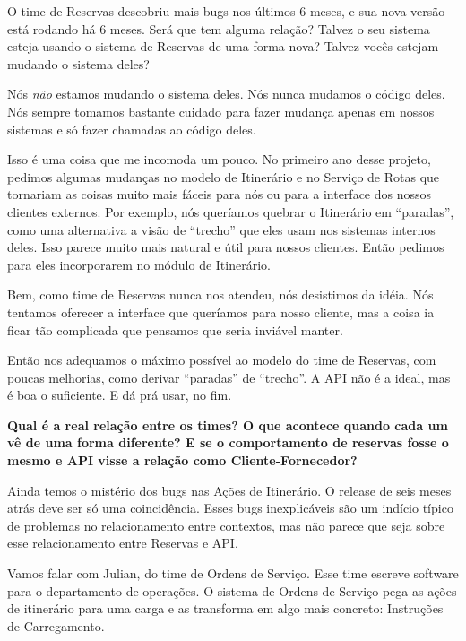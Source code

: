 \documentclass[12pt,play]{article}
\begin{document}
\narr {}
\scene
\dani O time de Reservas descobriu mais bugs nos últimos 6 meses, e sua nova versão está rodando há 6 meses. Será que tem alguma relação? Talvez o seu sistema esteja usando o sistema de Reservas de uma forma nova? Talvez vocês estejam mudando o sistema deles?

\joao {} Nós \emph{não} estamos mudando o sistema deles. Nós nunca mudamos o código deles. Nós sempre tomamos bastante cuidado para fazer mudança apenas em nossos sistemas e só fazer chamadas ao código deles.

Isso é uma coisa que me incomoda um pouco. No primeiro ano desse projeto, pedimos algumas mudanças no modelo de Itinerário e no Serviço de Rotas que tornariam as coisas muito mais fáceis para nós ou para a interface dos nossos clientes externos. Por exemplo, nós queríamos quebrar o Itinerário em ``paradas'', como uma alternativa a visão de ``trecho'' que eles usam nos sistemas internos deles. Isso parece muito mais natural e útil para nossos clientes. Então pedimos para eles incorporarem no módulo de Itinerário.

Bem, como time de Reservas nunca nos atendeu, nós desistimos da idéia. Nós tentamos oferecer a interface que queríamos para nosso cliente, mas a coisa ia ficar tão complicada que pensamos que seria inviável manter.

Então nos adequamos o máximo possível ao modelo do time de Reservas, com poucas melhorias, como derivar ``paradas'' de ``trecho''. A API não é a ideal, mas é boa o suficiente. E dá prá usar, no fim.

\narr \textbf{ Qual é a real relação entre os times? O que acontece quando cada um vê de uma forma diferente? E se o comportamento de reservas fosse o mesmo e API visse a relação como Cliente-Fornecedor?}


\narr Ainda temos o mistério dos bugs nas Ações de Itinerário. O release de seis meses atrás deve ser só uma coincidência. Esses bugs inexplicáveis são um indício típico de problemas no relacionamento entre contextos, mas não parece que seja sobre esse relacionamento entre Reservas e API.

\act
\narr Vamos falar com Julian, do time de Ordens de Serviço. Esse time escreve software para o departamento de operações.
\narr {} O sistema de Ordens de Serviço pega as ações de itinerário para uma carga e as transforma em algo mais concreto: Instruções de Carregamento.
\end{document}
